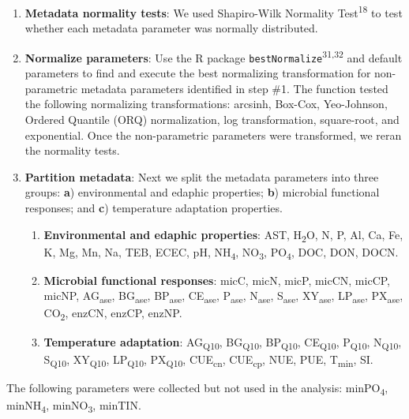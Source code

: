 \documentclass[
  10pt,
  letterpaper,
  DIV=11,
  numbers=noendperiod]{scrartcl}
\begin{document}
\begin{enumerate}
\def\labelenumi{\arabic{enumi})}
\item
  \textbf{Metadata normality tests}: We used Shapiro-Wilk Normality
  Test\textsuperscript{18} to test whether each metadata parameter was
  normally distributed.
\item
  \textbf{Normalize parameters}: Use the R package
  \texttt{bestNormalize}\textsuperscript{31,32} and default parameters
  to find and execute the best normalizing transformation for
  non-parametric metadata parameters identified in step \#1. The
  function tested the following normalizing transformations: arcsinh,
  Box-Cox, Yeo-Johnson, Ordered Quantile (ORQ) normalization, log
  transformation, square-root, and exponential. Once the non-parametric
  parameters were transformed, we reran the normality tests.
\item
  \textbf{Partition metadata}: Next we split the metadata parameters
  into three groups: \textbf{a}) environmental and edaphic properties;
  \textbf{b}) microbial functional responses; and \textbf{c})
  temperature adaptation properties.

  \begin{enumerate}
  \def\labelenumii{\roman{enumii})}
  \item
    \textbf{Environmental and edaphic properties}: AST,
    H\textsubscript{2}O, N, P, Al, Ca, Fe, K, Mg, Mn, Na, TEB, ECEC, pH,
    NH\textsubscript{4}, NO\textsubscript{3}, PO\textsubscript{4}, DOC,
    DON, DOCN.
  \item
    \textbf{Microbial functional responses}: micC, micN, micP, micCN,
    micCP, micNP, AG\textsubscript{ase}, BG\textsubscript{ase},
    BP\textsubscript{ase}, CE\textsubscript{ase}, P\textsubscript{ase},
    N\textsubscript{ase}, S\textsubscript{ase}, XY\textsubscript{ase},
    LP\textsubscript{ase}, PX\textsubscript{ase}, CO\textsubscript{2},
    enzCN, enzCP, enzNP.
  \item
    \textbf{Temperature adaptation}: AG\textsubscript{Q10},
    BG\textsubscript{Q10}, BP\textsubscript{Q10}, CE\textsubscript{Q10},
    P\textsubscript{Q10}, N\textsubscript{Q10}, S\textsubscript{Q10},
    XY\textsubscript{Q10}, LP\textsubscript{Q10}, PX\textsubscript{Q10},
    CUE\textsubscript{cn}, CUE\textsubscript{cp}, NUE, PUE,
    T\textsubscript{min}, SI.
  \end{enumerate}
\end{enumerate}

The following parameters were collected but not used in the analysis:
minPO\textsubscript{4}, minNH\textsubscript{4}, minNO\textsubscript{3},
minTIN.
\end{document}
